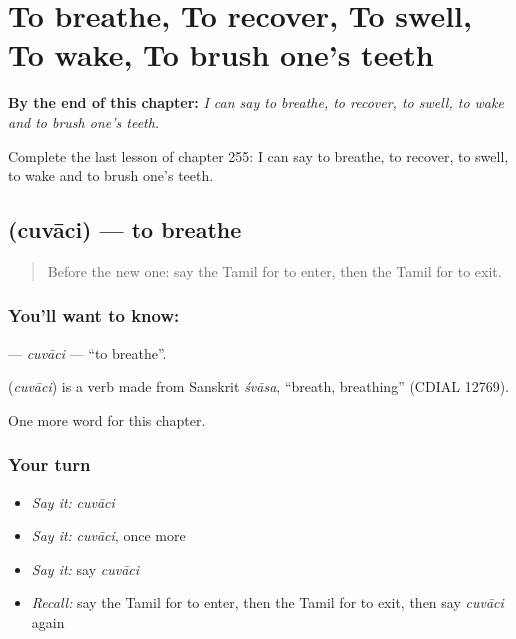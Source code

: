 
\chapter{To breathe, To recover, To swell, To wake, To brush one's teeth}
\label{ch:ta-to-breathe-to-recover-to-swell-to-wake-to-brush-one-s-teeth}

\begin{chapteropening}
\textbf{By the end of this chapter:} \emph{I can say to breathe, to recover, to swell, to wake and to brush one's teeth.}

Complete the last lesson of chapter 255: I can say to breathe, to recover, to swell, to wake and to brush one's teeth.
\end{chapteropening}

\section[\texorpdfstring{\ta{சுவாசி} (cuvāci)}{சுவாசி (cuvāci)}]{ (cuvāci) — to breathe}

\label{lesson:TA-C255-cuvaci}



\begin{quote}
Before the new one: say the Tamil for to enter, then the Tamil for to exit.
\end{quote}

\subsection*{You'll want to know: }
\textbf{} — \emph{cuvāci} — \textquotedblleft{}to breathe\textquotedblright{}.

\begin{cousinweb}
\textbf{} (\emph{cuvāci}) is a verb made from Sanskrit \emph{śvāsa}, \textquotedblleft{}breath, breathing\textquotedblright{} (CDIAL 12769).
\end{cousinweb}

\begin{grammarlens}[title={What you've built}]
One more word for this chapter.
\end{grammarlens}

\subsection*{Your turn}
\begin{itemize}
\raggedright
  \item \emph{Say it:} \emph{cuvāci}
  \item \emph{Say it:} \emph{cuvāci}, once more
  \item \emph{Say it:} say \emph{cuvāci}
  \item \emph{Recall:} say the Tamil for to enter, then the Tamil for to exit, then say \emph{cuvāci} again
\end{itemize}

